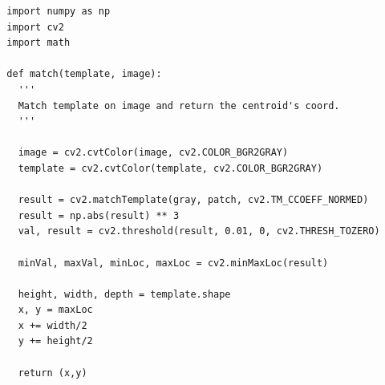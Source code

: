 \begin{verbatim}
  import numpy as np
  import cv2
  import math

  def match(template, image):
    '''
    Match template on image and return the centroid's coord.
    '''

    image = cv2.cvtColor(image, cv2.COLOR_BGR2GRAY)
    template = cv2.cvtColor(template, cv2.COLOR_BGR2GRAY)

    result = cv2.matchTemplate(gray, patch, cv2.TM_CCOEFF_NORMED)
    result = np.abs(result) ** 3
    val, result = cv2.threshold(result, 0.01, 0, cv2.THRESH_TOZERO)

    minVal, maxVal, minLoc, maxLoc = cv2.minMaxLoc(result)

    height, width, depth = template.shape
    x, y = maxLoc
    x += width/2
    y += height/2
      
    return (x,y)
\end{verbatim}

